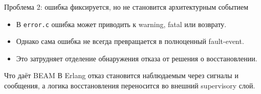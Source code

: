 \begin{frame}{Проблема 2: ошибка фиксируется, но не становится архитектурным событием}
	\begin{itemize}
		\item В \texttt{error.c} ошибка может приводить к warning, fatal или возврату.
		\item Однако сама ошибка не всегда превращается в полноценный fault-event.
		\item Это затрудняет отделение обнаружения отказа от решения о восстановлении.
	\end{itemize}
	
	\vspace{0.3cm}
	
	\begin{block}{Что даёт BEAM}
		В Erlang отказ становится наблюдаемым через сигналы и сообщения, а логика восстановления переносится во внешний supervisory слой.
	\end{block}
\end{frame}